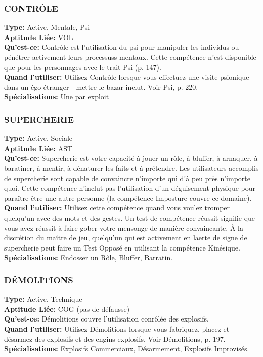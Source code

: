 \subsubsection{CONTRÔLE} \textbf{Type:} Active, Mentale, Psi \\ \textbf{Aptitude Liée:} VOL \\ \textbf{Qu'est-ce:} Contrôle est l'utilisation du psi pour manipuler les individus ou pénétrer activement leurs processuss mentaux. Cette compétence n'est disponible que pour les personnages avec le trait Psi (p. 147). \\ \textbf{Quand l'utiliser:} Utilisez Contrôle lorsque vous effectuez une visite psionique dans un égo étranger - mettre le bazar inclut. Voir Psi, p. 220. \\ \textbf{Spécialisations:} Une par exploit 

\subsubsection{SUPERCHERIE} \textbf{Type:} Active, Sociale \\ \textbf{Aptitude Liée:} AST \\ \textbf{Qu'est-ce:} Supercherie est votre capacité à jouer un rôle, à bluffer, à arnaquer, à baratiner, à mentir, à dénaturer les faits et à prétendre. Les utilisateurs accomplis de supercherie sont capable de convaincre n'importe qui d'à peu près n'importe quoi. Cette compétence n'inclut pas l'utilisation d'un déguisement physique pour paraître être une autre personne (la compétence Imposture couvre ce domaine). \\ \textbf{Quand l'utiliser:} Utilisez cette compétence quand vous voulez tromper quelqu'un avec des mots et des gestes. Un test de compétence réussit signifie que vous avez réussit à faire gober votre mensonge de manière convaincante. À la discrétion du maître de jeu, quelqu'un qui est activement en laerte de signe de supercherie peut faire un Test Opposé en utilisant la compétence Kinésique. \\ \textbf{Spécialisations:} Endosser un Rôle, Bluffer, Barratin. 

\subsubsection{DÉMOLITIONS} \textbf{Type:} Active, Technique\\ \textbf{Aptitude Liée:} COG (pas de défausse) \\ \textbf{Qu'est-ce:} Démolitions couvre l'utilisation conrôlée des explosifs. \\ \textbf{Quand l'utiliser:} Utilisez Démolitions lorsque vous fabriquez, placez et désarmez des explosifs et des engins explosifs. Voir Démolitions, p. 197. \\ \textbf{Spécialisations:} Explosifs Commerciaux, Désarmement, Explosifs Improvisés. 

